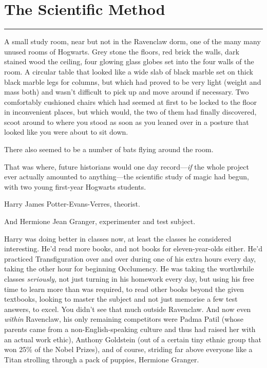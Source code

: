 \chapter{The Scientific Method}\label{the-scientific-method}

\begin{center}\rule{3in}{0.4pt}\end{center}

A small study room, near but not in the Ravenclaw dorm, one of the many
many unused rooms of Hogwarts. Grey stone the floors, red brick the
walls, dark stained wood the ceiling, four glowing glass globes set into
the four walls of the room. A circular table that looked like a wide
slab of black marble set on thick black marble legs for columns, but
which had proved to be very light (weight and mass both) and wasn't
difficult to pick up and move around if necessary. Two comfortably
cushioned chairs which had seemed at first to be locked to the floor in
inconvenient places, but which would, the two of them had finally
discovered, scoot around to where you stood as soon as you leaned over
in a posture that looked like you were about to sit down.

There also seemed to be a number of bats flying around the room.

That was where, future historians would one day record---\emph{if} the
whole project ever actually amounted to anything---the scientific study
of magic had begun, with two young first-year Hogwarts students.

Harry James Potter-Evans-Verres, theorist.

And Hermione Jean Granger, experimenter and test subject.

Harry was doing better in classes now, at least the classes he
considered interesting. He'd read more books, and not books for
eleven-year-olds either. He'd practiced Transfiguration over and over
during one of his extra hours every day, taking the other hour for
beginning Occlumency. He was taking the worthwhile classes
\emph{seriously,} not just turning in his homework every day, but using
his free time to learn more than was required, to read other books
beyond the given textbooks, looking to master the subject and not just
memorise a few test answers, to excel. You didn't see that much outside
Ravenclaw. And now even \emph{within} Ravenclaw, his only remaining
competitors were Padma Patil (whose parents came from a
non-English-speaking culture and thus had raised her with an actual work
ethic), Anthony Goldstein (out of a certain tiny ethnic group that won
25\% of the Nobel Prizes), and of course, striding far above everyone
like a Titan strolling through a pack of puppies, Hermione Granger.

